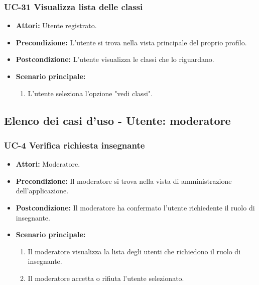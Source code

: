 \subsubsection{UC-31 Visualizza lista delle classi}		
\begin{itemize}
	\item \textbf{Attori:} Utente registrato.
	\item \textbf{Precondizione:} L'utente si trova nella vista principale del proprio profilo.
	\item \textbf{Postcondizione:} L'utente visualizza le classi che lo riguardano.
	\item \textbf{Scenario principale:}
	\begin{enumerate}
		\item L'utente seleziona l'opzione "vedi classi".
	\end{enumerate}		
\end{itemize}

\subsection{Elenco dei casi d'uso - Utente: moderatore}	
\subsubsection{UC-4 Verifica richiesta insegnante}
		\begin{itemize}
			\item \textbf{Attori:} Moderatore.
			\item \textbf{Precondizione:} Il moderatore si trova nella vista di amministrazione dell'applicazione.
			\item \textbf{Postcondizione:} Il moderatore ha confermato l'utente richiedente il ruolo di insegnante.
			\item \textbf{Scenario principale:}
				\begin{enumerate}
					\item Il moderatore visualizza la lista degli utenti che richiedono il ruolo di insegnante.
					\item Il moderatore accetta o rifiuta l'utente selezionato.
				\end{enumerate}
		\end{itemize}
		
